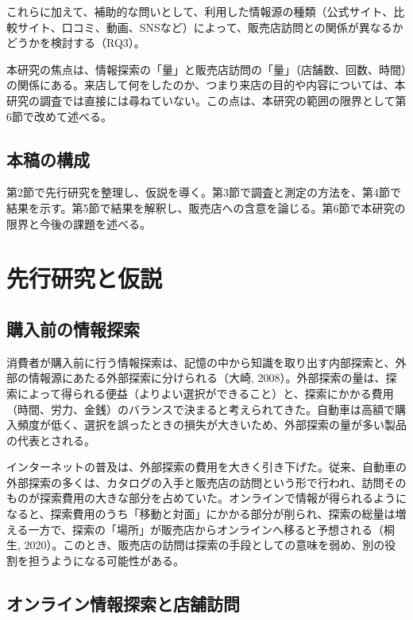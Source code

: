 これらに加えて、補助的な問いとして、利用した情報源の種類（公式サイト、比較サイト、口コミ、動画、SNSなど）によって、販売店訪問との関係が異なるかどうかを検討する（RQ3）。

本研究の焦点は、情報探索の「量」と販売店訪問の「量」（店舗数、回数、時間）の関係にある。来店して何をしたのか、つまり来店の目的や内容については、本研究の調査では直接には尋ねていない。この点は、本研究の範囲の限界として第6節で改めて述べる。

\subsection{本稿の構成}

第2節で先行研究を整理し、仮説を導く。第3節で調査と測定の方法を、第4節で結果を示す。第5節で結果を解釈し、販売店への含意を論じる。第6節で本研究の限界と今後の課題を述べる。

\section{先行研究と仮説}

\subsection{購入前の情報探索}

消費者が購入前に行う情報探索は、記憶の中から知識を取り出す内部探索と、外部の情報源にあたる外部探索に分けられる（大崎, 2008）。外部探索の量は、探索によって得られる便益（よりよい選択ができること）と、探索にかかる費用（時間、労力、金銭）のバランスで決まると考えられてきた。自動車は高額で購入頻度が低く、選択を誤ったときの損失が大きいため、外部探索の量が多い製品の代表とされる。

インターネットの普及は、外部探索の費用を大きく引き下げた。従来、自動車の外部探索の多くは、カタログの入手と販売店の訪問という形で行われ、訪問そのものが探索費用の大きな部分を占めていた。オンラインで情報が得られるようになると、探索費用のうち「移動と対面」にかかる部分が削られ、探索の総量は増える一方で、探索の「場所」が販売店からオンラインへ移ると予想される（桐生, 2020）。このとき、販売店の訪問は探索の手段としての意味を弱め、別の役割を担うようになる可能性がある。

\subsection{オンライン情報探索と店舗訪問}

